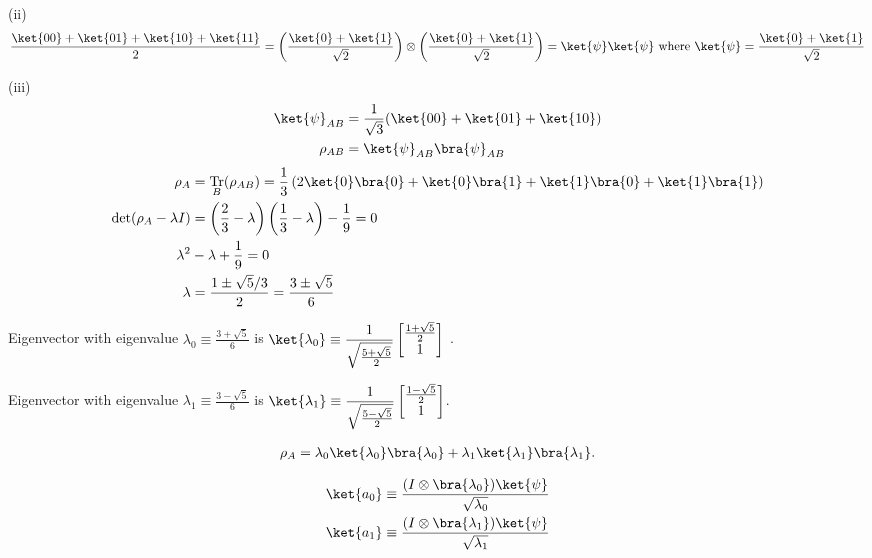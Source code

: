 \documentclass[a4paper,12pt]{article}
\DeclareMathOperator{\Tr}{Tr}
\begin{document}
(ii)
\begin{align*}
	\frac{\ket{00}+ \ket{01} + \ket{10} + \ket{11}}{2} = \left( \frac{\ket{0} + \ket{1}}{\sqrt{2}}  \right) \otimes \left( \frac{\ket{0} + \ket{1}}{\sqrt{2}}  \right) = \ket{\psi} \ket{\psi} \text{ where } \ket{\psi} = \frac{\ket{0} + \ket{1}}{\sqrt{2}}
\end{align*}



(iii)
\begin{align*}
	\ket{\psi}_{AB} &= \frac{1}{\sqrt{3}} (\ket{00} + \ket{01} + \ket{10})\\
	\rho_{AB} &= \ket{\psi}_{AB}\bra{\psi}_{AB}
\end{align*}
%
%
%
\begin{align*}
	\rho_A &= \Tr_B (\rho_{AB}) = \frac{1}{3} \left( 2\ket{0}\bra{0} + \ket{0}\bra{1} + \ket{1}\bra{0} + \ket{1}\bra{1} \right)\\
	\det (\rho_A - \lambda I) &= \left( \frac{2}{3} - \lambda \right) \left( \frac{1}{3} - \lambda \right) - \frac{1}{9} = 0\\
	\lambda^2 &- \lambda + \frac{1}{9} = 0\\
	\lambda &= \frac{1 \pm \sqrt{5} / 3}{2} = \frac{3 \pm \sqrt{5}}{6}
\end{align*}



Eigenvector with eigenvalue $\displaystyle \lambda_0 \equiv \frac{3 + \sqrt{5}}{6}$ is $\displaystyle \ket{\lambda_0} \equiv \frac{1}{\sqrt{\frac{5 + \sqrt{5}}{2}}} \begin{bmatrix}
    \frac{1 + \sqrt{5}}{2} \\
    1
\end{bmatrix}$ .

Eigenvector with eigenvalue $\displaystyle \lambda_1 \equiv \frac{3 - \sqrt{5}}{6}$ is $\displaystyle \ket{\lambda_1} \equiv \frac{1}{\sqrt{\frac{5 - \sqrt{5}}{2}}} \begin{bmatrix}
    \frac{1 - \sqrt{5}}{2} \\
    1
\end{bmatrix} $.

\begin{align*}
	\rho_A = \lambda_0 \ket{\lambda_0}\bra{\lambda_0} + \lambda_1 \ket{\lambda_1}\bra{\lambda_1}.
\end{align*}


\begin{align*}
	\ket{a_0} \equiv \frac{(I \otimes \bra{\lambda_0}) \ket{\psi} }{\sqrt{\lambda_0}}\\
	\ket{a_1} \equiv \frac{(I \otimes \bra{\lambda_1}) \ket{\psi} }{\sqrt{\lambda_1}}
\end{align*}
\end{document}
